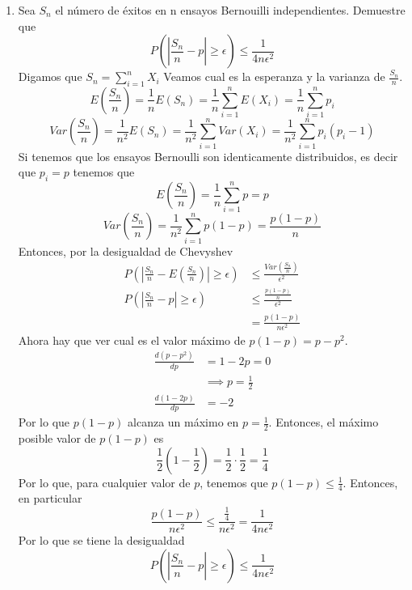 \documentclass[11pt,a4paper]{report}
\begin{document}
\begin{enumerate}
		\item{
		Sea $S_{n}$ el número de éxitos en n ensayos Bernouilli independientes.
        Demuestre que
        $$P(|\frac{S_{n}}{n}-p|\geq \epsilon)\leq \frac{1}{4n\epsilon^2}$$
        Digamos que $S_{n} = \sum_{i=1}^{n}{X_{i}}$
		Veamos cual es la esperanza y la varianza de $\frac{S_{n}}{n}$.
        \[E(\frac{S_{n}}{n}) = \frac{1}{n}E(S_{n})
        = \frac{1}{n}\sum_{i=1}^{n}{E(X_{i})} = \frac{1}{n}\sum_{i=1}^{n}{p_{i}}\]
        \[Var(\frac{S_{n}}{n}) = \frac{1}{n^2}E(S_{n})
        = \frac{1}{n^2}\sum_{i=1}^{n}{Var(X_{i})} =
        \frac{1}{n^2}\sum_{i=1}^{n}{p_{i}(p_{i}-1)}\]
        Si tenemos que los ensayos Bernoulli son identicamente distribuidos,
        es decir que $p_i = p$ tenemos que
        \[E(\frac{S_{n}}{n}) = \frac{1}{n}\sum_{i=1}^{n}{p} = p\]
        \[Var(\frac{S_{n}}{n}) = \frac{1}{n^2}\sum_{i=1}^{n}{p(1-p)}
        =\frac{p(1-p)}{n}\]
        Entonces, por la desigualdad de Chevyshev
        \begin{align*}
            P(|\frac{S_{n}}{n} - E(\frac{S_{n}}{n})| \geq \epsilon) &\leq
            \frac{Var(\frac{S_{n}}{n})}{\epsilon^2}\\
            P(|\frac{S_{n}}{n} - p| \geq \epsilon) &\leq
            \frac{\frac{p(1-p)}{n}}{\epsilon^2} \\
            &=\frac{p(1-p)}{n\epsilon^2}
        \end{align*}
        Ahora hay que ver cual es el valor máximo de $p(1-p) = p - p^2$.
        \begin{align*}
            \frac{d(p - p^2)}{dp} &= 1 - 2p = 0 \\
            &\implies p = \frac{1}{2}\\
            \frac{d(1 - 2p)}{dp} &= -2
        \end{align*}
        Por lo que $p(1-p)$ alcanza un máximo en $p = \frac{1}{2}$.
        Entonces, el máximo posible valor de $p(1-p)$ es
        \[\frac{1}{2}(1-\frac{1}{2}) = \frac{1}{2}\cdot \frac{1}{2} = \frac{1}{4}\]
        Por lo que, para cualquier valor de $p$, tenemos que
        $p(1-p)\leq \frac{1}{4}$.
        Entonces, en particular
        \[\frac{p(1-p)}{n\epsilon^2} \leq \frac{\frac{1}{4}}{n\epsilon^2}
        = \frac{1}{4n\epsilon^2}\]
        Por lo que se tiene la desigualdad
        \[P(|\frac{S_{n}}{n}-p|\geq \epsilon)\leq \frac{1}{4n\epsilon^2}\]
		}


\end{enumerate}
\end{document}
